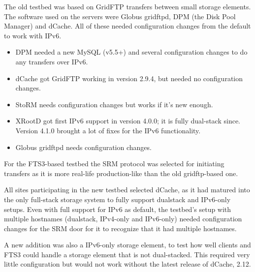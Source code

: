 The old testbed was based on GridFTP\cite{GFTP1.0, GFTP2.0} transfers between small storage elements. The software used on the servers were Globus gridftpd, 
DPM (the Disk Pool Manager) and dCache. 
All of these needed configuration changes from the default to work with IPv6.

\begin{itemize}
\item DPM needed a new MySQL (v5.5+) and several configuration changes to do any transfers over IPv6.
\item dCache got GridFTP working in version 2.9.4, but needed no configuration changes.
\item StoRM needs configuration changes but works if it's new enough.
\item XRootD got first IPv6 support in version 4.0.0; it is fully dual-stack since. Version 4.1.0 brought a lot of fixes for the IPv6 functionality.
\item Globus gridftpd needs configuration changes.
\end{itemize}

For the FTS3-based testbed the SRM protocol \cite{SRM2.2} was selected for initiating transfers as it is more real-life production-like 
than the old gridftp-based one. 

All sites participating in the new testbed selected dCache, as it had matured into the only full-stack storage 
system to fully support dualstack and IPv6-only setups. Even with full support for IPv6 as default, the testbed's setup with 
multiple hostnames (dualstack, IPv4-only and IPv6-only) needed configuration changes for the SRM door for it to recognize that it had multiple hostnames.

A new addition was also a IPv6-only storage element, to test how well clients and FTS3 could handle a storage element that is not dual-stacked.
This required very little configuration but would not work without the latest release of dCache, 2.12.



